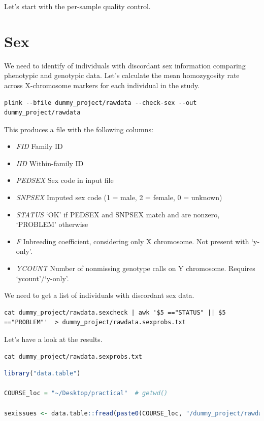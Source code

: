 \documentclass[
]{book}
\providecommand{\tightlist}{%
  \setlength{\itemsep}{0pt}\setlength{\parskip}{0pt}}
\begin{document}
Let's start with the per-sample quality control.

\hypertarget{sex}{%
\section{Sex}\label{sex}}

We need to identify of individuals with discordant sex information comparing phenotypic and genotypic data. Let's calculate the mean homozygosity rate across X-chromosome markers for each individual in the study.

\begin{lstlisting}
plink --bfile dummy_project/rawdata --check-sex --out dummy_project/rawdata
\end{lstlisting}

This produces a file with the following columns:

\begin{itemize}
\tightlist
\item
  \emph{FID} Family ID
\item
  \emph{IID} Within-family ID
\item
  \emph{PEDSEX} Sex code in input file
\item
  \emph{SNPSEX} Imputed sex code (1 = male, 2 = female, 0 = unknown)
\item
  \emph{STATUS} `OK' if PEDSEX and SNPSEX match and are nonzero, `PROBLEM' otherwise
\item
  \emph{F} Inbreeding coefficient, considering only X chromosome. Not present with `y-only'.
\item
  \emph{YCOUNT} Number of nonmissing genotype calls on Y chromosome. Requires `ycount'/`y-only'.
\end{itemize}

We need to get a list of individuals with discordant sex data.

\begin{lstlisting}
cat dummy_project/rawdata.sexcheck | awk '$5 =="STATUS" || $5 =="PROBLEM"'  > dummy_project/rawdata.sexprobs.txt
\end{lstlisting}

Let's have a look at the results.

\begin{lstlisting}
cat dummy_project/rawdata.sexprobs.txt
\end{lstlisting}

\begin{lstlisting}[language=R]
library("data.table")

COURSE_loc = "~/Desktop/practical"  # getwd()

sexissues <- data.table::fread(paste0(COURSE_loc, "/dummy_project/rawdata.sexprobs.txt"))
\end{lstlisting}
\end{document}
